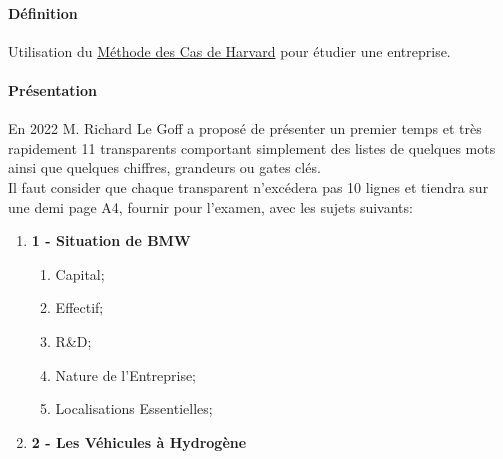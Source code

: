 \documentclass{article}
\begin{document}
\paragraph{Définition}Utilisation du \href{https://fr.wikipedia.org/wiki/M%C3%A9thode_des_cas}{Méthode des Cas de Harvard} pour étudier une entreprise.

\paragraph{Présentation}En 2022 M. Richard Le Goff a proposé de présenter un premier temps et très rapidement 11 transparents comportant simplement des listes de quelques mots ainsi que quelques chiffres, grandeurs ou gates clés.\\

\noindent Il faut consider que chaque transparent n'excédera pas 10 lignes et tiendra sur une demi page A4, fournir pour l'examen, avec les sujets suivants:
\begin{enumerate}
    \item \textbf{1 - Situation de BMW}
    \begin{enumerate}[noitemsep]
        \item Capital;
        \item Effectif;
        \item R\&D;
        \item Nature de l'Entreprise;
        \item Localisations Essentielles;
    \end{enumerate}

    \item \textbf{2 - Les Véhicules à Hydrogène}
\end{enumerate} 






\end{document}
